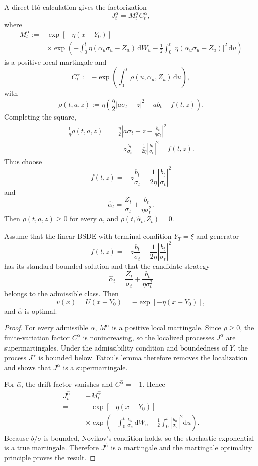 A direct It\^o calculation gives the factorization
\[
J_t^\alpha=M_t^\alpha C_t^\alpha,
\]
where
\[
\begin{aligned}
M_t^\alpha
:={}&\exp[-\eta(x-Y_0)]\\
&\times\exp\!\left(
-\int_0^t\eta(\alpha_u\sigma_u-Z_u)\,\mathrm dW_u
-\frac12\int_0^t
|\eta(\alpha_u\sigma_u-Z_u)|^2\,\mathrm du
\right)
\end{aligned}
\]
is a positive local martingale and
\[
C_t^\alpha
:=-\exp\!\left(
\int_0^t\rho(u,\alpha_u,Z_u)\,\mathrm du
\right),
\]
with
\[
\rho(t,a,z)
:=\eta\left(
\frac\eta2|a\sigma_t-z|^2
-ab_t-f(t,z)
\right).
\]
Completing the square,
\[
\begin{aligned}
\frac1\eta\rho(t,a,z)
={}&\frac\eta2
\left|a\sigma_t-z-\frac{b_t}{\eta\sigma_t}\right|^2\\
&-z\frac{b_t}{\sigma_t}
-\frac1{2\eta}
\left|\frac{b_t}{\sigma_t}\right|^2
-f(t,z).
\end{aligned}
\]
Thus choose
\[
f(t,z)
=-z\frac{b_t}{\sigma_t}
-\frac1{2\eta}
\left|\frac{b_t}{\sigma_t}\right|^2
\]
and
\[
\hat\alpha_t
=\frac{Z_t}{\sigma_t}
+\frac{b_t}{\eta\sigma_t^2}.
\]
Then \(\rho(t,a,z)\ge0\) for every \(a\), and \(\rho(t,\hat\alpha_t,Z_t)=0\).

\begin{thm}
Assume that the linear BSDE with terminal condition \(Y_T=\xi\) and generator
\[
f(t,z)
=-z\frac{b_t}{\sigma_t}
-\frac1{2\eta}
\left|\frac{b_t}{\sigma_t}\right|^2
\]
has its standard bounded solution and that the candidate strategy
\[
\hat\alpha_t
=\frac{Z_t}{\sigma_t}
+\frac{b_t}{\eta\sigma_t^2}
\]
belongs to the admissible class. Then
\[
v(x)=U(x-Y_0)=-\exp[-\eta(x-Y_0)],
\]
and \(\hat\alpha\) is optimal.
\end{thm}

\begin{proof}
For every admissible \(\alpha\), \(M^\alpha\) is a positive local martingale. Since \(\rho\ge0\), the finite-variation factor \(C^\alpha\) is nonincreasing, so the localized processes \(J^\alpha\) are supermartingales. Under the admissibility condition and boundedness of \(Y\), the process \(J^\alpha\) is bounded below. Fatou's lemma therefore removes the localization and shows that \(J^\alpha\) is a supermartingale.

For \(\hat\alpha\), the drift factor vanishes and \(C^{\hat\alpha}=-1\). Hence
\[
\begin{aligned}
J_t^{\hat\alpha}
={}&-M_t^{\hat\alpha}\\
={}&-\exp[-\eta(x-Y_0)]\\
&\times\exp\!\left(
-\int_0^t\frac{b_u}{\sigma_u}\,\mathrm dW_u
-\frac12\int_0^t
\left|\frac{b_u}{\sigma_u}\right|^2\mathrm du
\right).
\end{aligned}
\]
Because \(b/\sigma\) is bounded, Novikov's condition holds, so the stochastic exponential is a true martingale. Therefore \(J^{\hat\alpha}\) is a martingale and the martingale optimality principle proves the result.
\end{proof}

